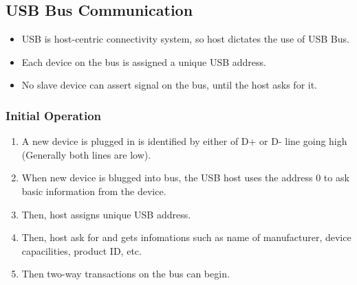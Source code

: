 \documentclass{article}
\begin{document}
\subsection{USB Bus Communication}
\begin{itemize}
    \item USB is host-centric connectivity system, so host dictates the use of USB Bus.
    \item Each device on the bus is assigned a unique USB address.
    \item No slave device can assert signal on the bus, until the host asks for it.
\end{itemize}

\subsubsection{Initial Operation}
\begin{enumerate}[label=\roman*)]
    \item A new device is plugged in is identified by either of D+ or D- line going high (Generally both lines are low).
    \item When new device is blugged into bus, the USB host uses the address 0 to ask basic information from the device.
    \item Then, host assigns unique USB address.
    \item Then, host ask for and gets infomations such as name of manufacturer, device capacilities, product ID, etc.
    \item Then two-way transactions on the bus can begin.
\end{enumerate}
\end{document}
